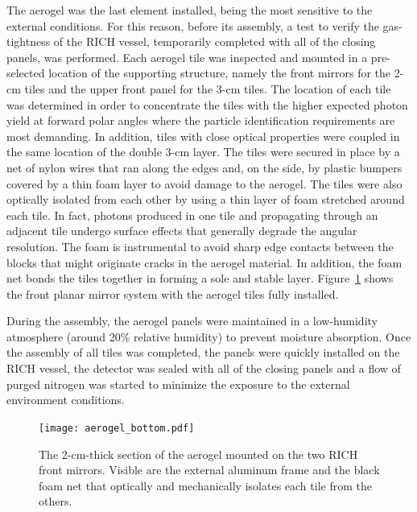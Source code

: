 \documentclass[5p,times,twocolumn]{elsarticle}
\begin{document}
The aerogel was the last element installed, being the most sensitive to the external conditions. For this reason, before
its assembly, a test to verify the gas-tightness of the RICH vessel, temporarily completed with all of the closing panels,
was performed. Each aerogel tile was inspected and mounted in a pre-selected location of the supporting structure,
namely the front mirrors for the 2-cm tiles and the upper front panel for the 3-cm tiles. The location of
each tile was determined in order to concentrate the tiles with the higher expected photon yield at forward polar
angles where the particle identification requirements are most demanding. In addition, tiles with close optical
properties were coupled in the same location of the double 3-cm layer. The tiles were secured in place by a net of
nylon wires that ran along the edges and, on the side, by plastic bumpers covered by a thin foam layer to avoid
damage to the aerogel. The tiles were also optically isolated from each other by using a thin layer of foam stretched around
each tile. In fact, photons produced in one tile and propagating through an adjacent tile undergo surface effects that
generally degrade the angular resolution. The foam is instrumental to avoid sharp edge contacts between the blocks
that might originate cracks in the aerogel material. In addition, the foam net bonds the tiles together in forming a sole
and stable layer. Figure~\ref{Fig:AeroB1} shows the front planar mirror system with the aerogel tiles fully installed.

During the assembly, the aerogel panels were maintained in a low-humidity atmosphere (around 20\% relative humidity)
to prevent moisture absorption. Once the assembly of all tiles was completed, the panels were quickly installed on
the RICH vessel, the detector was sealed with all of the closing panels and a flow of purged nitrogen was started to
minimize the exposure to the external environment conditions.

\begin{figure}
\begin{center}
\texttt{[image: aerogel\_bottom.pdf]}
\caption{The 2-cm-thick section of the aerogel mounted on the two RICH front mirrors. Visible are the
  external aluminum frame and the black foam net that optically and mechanically isolates each tile from the others.}
\label{Fig:AeroB1}
\end{center}
\end{figure}
\end{document}
